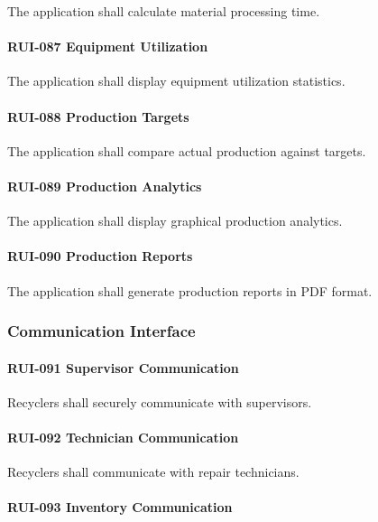 The application shall calculate material processing time.

\paragraph{RUI-087 Equipment Utilization}

The application shall display equipment utilization statistics.

\paragraph{RUI-088 Production Targets}

The application shall compare actual production against targets.

\paragraph{RUI-089 Production Analytics}

The application shall display graphical production analytics.

\paragraph{RUI-090 Production Reports}

The application shall generate production reports in PDF format.


\subsubsection*{Communication Interface}

\paragraph{RUI-091 Supervisor Communication}

Recyclers shall securely communicate with supervisors.

\paragraph{RUI-092 Technician Communication}

Recyclers shall communicate with repair technicians.

\paragraph{RUI-093 Inventory Communication}

